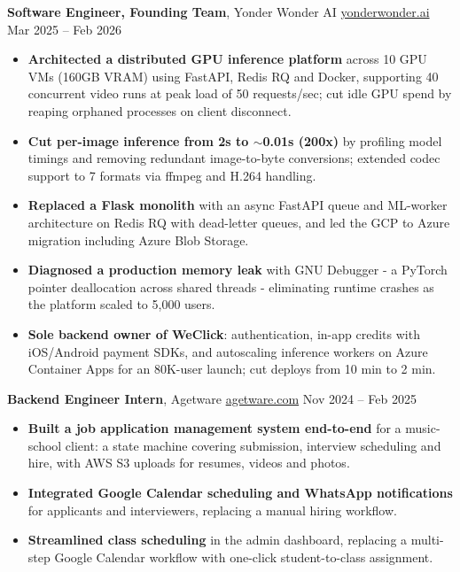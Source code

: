 \documentclass[10pt,a4paper]{article}
\newcommand{\experience}[5]{
    \vspace{0.25em}
    \noindent\textbf{#2}, #1 \; \href{#4}{\small #5} \hfill #3\par
    \vspace{0.1em}
}
\begin{document}
\experience
{Yonder Wonder AI}
{Software Engineer, Founding Team}
{Mar 2025 -- Feb 2026}
{https://yonderwonder.ai/}
{yonderwonder.ai}

\begin{itemize}[leftmargin=*,nosep]
\item \textbf{Architected a distributed GPU inference platform} across 10 GPU VMs (160GB VRAM) using FastAPI, Redis RQ and Docker, supporting 40 concurrent video runs at peak load of 50 requests/sec; cut idle GPU spend by reaping orphaned processes on client disconnect.
\item \textbf{Cut per-image inference from 2s to $\sim$0.01s (200x)} by profiling model timings and removing redundant image-to-byte conversions; extended codec support to 7 formats via ffmpeg and H.264 handling.
\item \textbf{Replaced a Flask monolith} with an async FastAPI queue and ML-worker architecture on Redis RQ with dead-letter queues, and led the GCP to Azure migration including Azure Blob Storage.
\item \textbf{Diagnosed a production memory leak} with GNU Debugger - a PyTorch pointer deallocation across shared threads - eliminating runtime crashes as the platform scaled to 5,000 users.
\item \textbf{Sole backend owner of WeClick}: authentication, in-app credits with iOS/Android payment SDKs, and autoscaling inference workers on Azure Container Apps for an 80K-user launch; cut deploys from 10 min to 2 min.
\end{itemize}

\experience
{Agetware}
{Backend Engineer Intern}
{Nov 2024 -- Feb 2025}
{https://www.agetware.com/}
{agetware.com}

\begin{itemize}[leftmargin=*,nosep]
\item \textbf{Built a job application management system end-to-end} for a music-school client: a state machine covering submission, interview scheduling and hire, with AWS S3 uploads for resumes, videos and photos.
\item \textbf{Integrated Google Calendar scheduling and WhatsApp notifications} for applicants and interviewers, replacing a manual hiring workflow.
\item \textbf{Streamlined class scheduling} in the admin dashboard, replacing a multi-step Google Calendar workflow with one-click student-to-class assignment.
\end{itemize}
\end{document}
